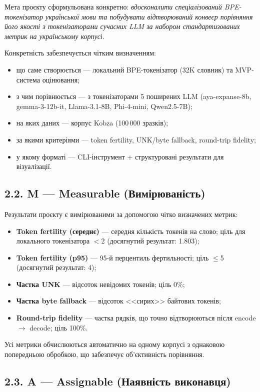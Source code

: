 \documentclass[14pt]{extarticle}
\begin{document}
Мета проєкту сформульована конкретно: \textit{вдосконалити спеціалізований BPE-токенізатор української мови та побудувати відтворюваний конвеєр порівняння його якості з токенізаторами сучасних LLM за набором стандартизованих метрик на українському корпусі}.

Конкретність забезпечується чітким визначенням:
\begin{itemize}
  \item що саме створюється --- локальний BPE-токенізатор (32K словник) та MVP-система оцінювання;
  \item з чим порівнюється --- з токенізаторами 5 поширених LLM (aya-expanse-8b, gemma-3-12b-it, Llama-3.1-8B, Phi-4-mini, Qwen2.5-7B);
  \item на яких даних --- корпус Kobza (100\,000 зразків);
  \item за якими критеріями --- token fertility, UNK/byte fallback, round-trip fidelity;
  \item у якому форматі --- CLI-інструмент + структуровані результати для візуалізації.
\end{itemize}

\subsection*{2.2. M --- Measurable (Вимірюваність)}

Результати проєкту є вимірюваними за допомогою чітко визначених метрик:
\begin{itemize}
  \item \textbf{Token fertility (середнє)} --- середня кількість токенів на слово; ціль для локального токенізатора $<$2 (досягнутий результат: 1.803);
  \item \textbf{Token fertility (p95)} --- 95-й перцентиль фертильності; ціль $\leq$5 (досягнутий результат: 4);
  \item \textbf{Частка UNK} --- відсоток невідомих токенів; ціль 0\%;
  \item \textbf{Частка byte fallback} --- відсоток <<сирих>> байтових токенів;
  \item \textbf{Round-trip fidelity} --- частка рядків, що точно відтворюються після encode $\to$ decode; ціль 100\%.
\end{itemize}

Усі метрики обчислюються автоматично на одному корпусі з однаковою попередньою обробкою, що забезпечує об'єктивність порівняння.

\subsection*{2.3. A --- Assignable (Наявність виконавця)}
\end{document}
